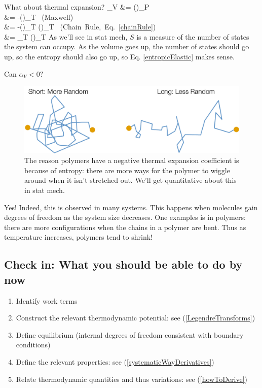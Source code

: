 \documentclass[12pt]{article}
\begin{document}
What about thermal expansion?
\eqs
\label{entropicElastic}
\alpha_V &= \left(\right)_P\\
&= -\left(\right)_T \mbox{ (Maxwell)}\\
&= -\left(\right)_T \left(\right)_T \mbox{ (Chain Rule, Eq. \ref{chainRule})}\\
&= \beta_T \left(\right)_T
\eqe
As we'll see in stat mech, $S$ is a measure of the number of states the system can occupy.  As the volume goes up, the number of states should go up, so the entropy should also go up, so Eq. \ref{entropicElastic} makes sense. 

Can $\alpha_V < 0?$
\begin{figure}[h]
\centering
\includegraphics[width=\textwidth]{Short_and_Long_Comparison}
\caption{The reason polymers have a negative thermal expansion coefficient is because of entropy: there are more ways for the polymer to wiggle around when it isn't stretched out. We'll get quantitative about this in stat mech.}
\label{shortLongEntropy}
\end{figure}
Yes! Indeed, this is observed in many systems. This happens when molecules gain degrees of freedom as the system size decreases. One examples is in polymers: there are more configurations when the chains in a polymer are bent. Thus as temperature increases, polymers tend to shrink!


\subsection{Check in: What you should be able to do by now}

\begin{enumerate}[(1)]
\item Identify work terms
\item Construct the relevant thermodynamic potential: see (\ref{LegendreTransforms})
\item Define equilibrium (internal degrees of freedom consistent with boundary conditions) 
\item Define the relevant properties: see (\ref{systematicWayDerivatives})
\item Relate thermodynamic quantities and thus variations: see (\ref{howToDerive})
\end{enumerate}
\end{document}
